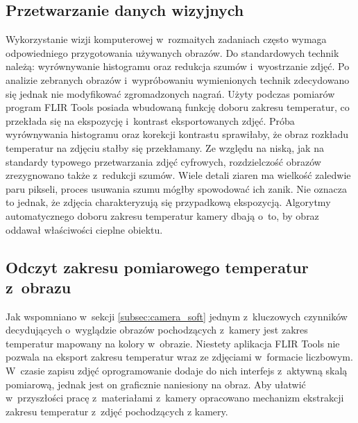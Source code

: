 \subsection{Przetwarzanie danych wizyjnych}
Wykorzystanie wizji komputerowej w~rozmaitych zadaniach często wymaga
odpowiedniego przygotowania używanych obrazów.
Do standardowych technik należą: wyrównywanie histogramu oraz redukcja szumów
i~wyostrzanie zdjęć.
Po analizie zebranych obrazów i~wypróbowaniu wymienionych technik zdecydowano
się jednak nie modyfikować zgromadzonych nagrań.
Użyty podczas pomiarów program FLIR Tools posiada wbudowaną funkcję
doboru zakresu temperatur, co przekłada się na ekspozycję i~kontrast
eksportowanych zdjęć.
Próba wyrównywania histogramu oraz korekcji kontrastu sprawiłaby, że obraz
rozkładu temperatur na zdjęciu stałby się przekłamany.
Ze względu na niską, jak na standardy typowego przetwarzania zdjęć cyfrowych,
rozdzielczość obrazów zrezygnowano także z~redukcji szumów.
Wiele detali ziaren ma wielkość zaledwie paru pikseli, proces usuwania szumu
mógłby spowodować ich zanik.
Nie oznacza to jednak, że zdjęcia charakteryzują się przypadkową ekspozycją.
Algorytmy automatycznego doboru zakresu temperatur kamery dbają o~to, by
obraz oddawał właściwości cieplne obiektu.

\subsection{Odczyt zakresu pomiarowego temperatur z~obrazu}
Jak wspomniano w~sekcji \ref{subsec:camera_soft} jednym z~kluczowych czynników
decydujących o~wyglądzie obrazów pochodzących z~kamery jest zakres temperatur
mapowany na kolory w~obrazie.
Niestety aplikacja FLIR Tools nie pozwala na eksport zakresu temperatur wraz
ze zdjęciami w~formacie liczbowym.
W~czasie zapisu zdjęć oprogramowanie dodaje do nich interfejs z~aktywną skalą
pomiarową, jednak jest on graficznie naniesiony na obraz.
Aby ułatwić w~przyszłości pracę z~materiałami z~kamery opracowano mechanizm
ekstrakcji zakresu temperatur z~zdjęć pochodzących z kamery.

